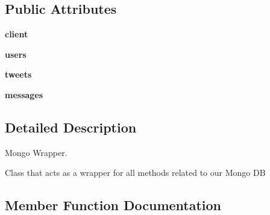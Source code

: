 \subsection*{Public Attributes}
\begin{DoxyCompactItemize}
\item 
\mbox{\label{classtwitter_1_1wrappers_1_1mongo__wrapper_1_1MongoAPI_a67a94b824415d1f71214935251f77a58}} 
{\bfseries client}
\item 
\mbox{\label{classtwitter_1_1wrappers_1_1mongo__wrapper_1_1MongoAPI_ad0c0cdc04fa5352dafc6f90f2e39b682}} 
{\bfseries users}
\item 
\mbox{\label{classtwitter_1_1wrappers_1_1mongo__wrapper_1_1MongoAPI_a47a3a708904c23154a9eee64b4b694c9}} 
{\bfseries tweets}
\item 
\mbox{\label{classtwitter_1_1wrappers_1_1mongo__wrapper_1_1MongoAPI_ad7ba1ef520ca7913137e8c2dcfbd26d4}} 
{\bfseries messages}
\end{DoxyCompactItemize}


\subsection{Detailed Description}
\begin{DoxyVerb}Mongo Wrapper.

Class that acts as a wrapper for all methods related to our Mongo DB
\end{DoxyVerb}
 

\subsection{Member Function Documentation}
\mbox{\label{classtwitter_1_1wrappers_1_1mongo__wrapper_1_1MongoAPI_a7c5d38f4ab2e2680224d47278b01d3bb}} 
